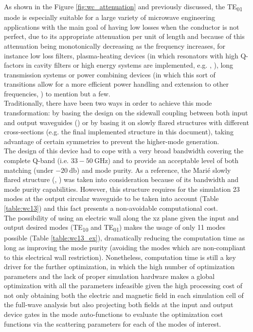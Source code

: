 \documentclass[english,twoside]{article}
\begin{document}
    As shown in the Figure \ref{fig:wc_attenuation} and previously discussed, the \ac{TE}\textsubscript{01} mode is especially suitable for a large variety of microwave engineering applications with the main goal of having low losses when the conductor is not perfect, due to its appropriate attenuation per unit of length and because of this attenuation being monotonically decreasing as the frequency increases, for instance low loss filters, plasma-heating devices (in which resonators with high Q-factors in cavity filters or high energy systems are implemented, e.g. \cite{blank}, \cite{leou}), long transmission systems or power combining devices (in which this sort of transitions allow for a more efficient power handling and extension to other frequencies, \cite{chen}) to mention but a few. \\

	Traditionally, there have been two ways in order to achieve this mode transformation: by basing the design on the sidewall coupling between both input and output waveguides (\cite{nusinovich}) or by basing it on slowly flared structures with different cross-sections (e.g. the final implemented structure in this document), taking advantage of certain symmetries to prevent the higher-mode generation.\\
    
    The design of this device had to cope with a very broad bandwidth covering the complete Q-band (i.e. $\num{33}-\SI{50}{\giga\hertz}$) and to provide an acceptable level of both matching (under $\SI{-20}{\decibel}$) and mode purity. As a reference, the Marié slowly flared structure (\cite{saad}, \cite{marie}) was taken into consideration because of its bandwidth and mode purity capabilities. However, this structure requires for the simulation 23 modes at the output circular waveguide to be taken into account (Table \ref{table:wc13}) and this fact presents a non-avoidable computational cost.\\
    
    The possibility of using an electric wall along the xz plane given the input and output desired modes (\ac{TE}\textsubscript{10} and \ac{TE}\textsubscript{01}) makes the usage of only 11 modes possible (Table \ref{table:wc13_ex}), dramatically reducing the computation time as long as improving the mode purity (avoiding the modes which are non-compliant to this electrical wall restriction). Nonetheless, computation time is still a key driver for the further optimization, in which the high number of optimization parameters and the lack of proper simulation hardware makes a global optimization with all the parameters infeasible given the high processing cost of not only obtaining both the electric and magnetic field in each simulation cell of the full-wave analysis but also projecting both fields at the input and output device gates in the mode auto-functions to evaluate the optimization cost functions via the scattering parameters for each of the modes of interest.\\
    
\end{document}
